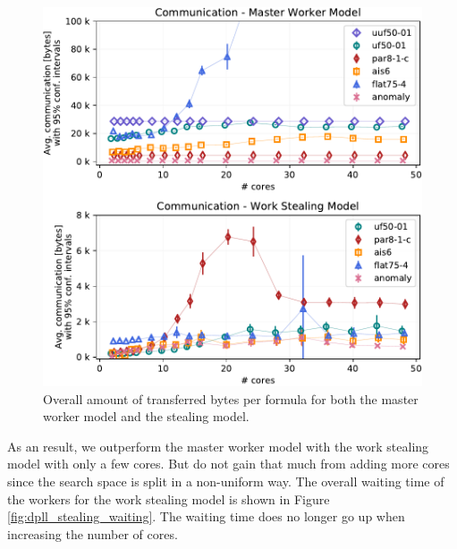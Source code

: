 \documentclass[letterpaper]{article}
\begin{document}
\begin{figure}[p]
    \centering
    \includegraphics[width=\columnwidth]{figures/comm_subset_dpll_scaling_tar.pdf}
    \caption{Overall amount of transferred bytes per formula for both the master worker model and the stealing model.}
    \label{fig:comm_reduce}
\end{figure}

As an result, we outperform the master worker model with the work stealing model with only a few cores.
But do not gain that much from adding more cores since the search space is split in a non-uniform way.
The overall waiting time of the workers for the work stealing model is shown in Figure \ref{fig:dpll_stealing_waiting}.
The waiting time does no longer go up when increasing the number of cores.
\end{document}
